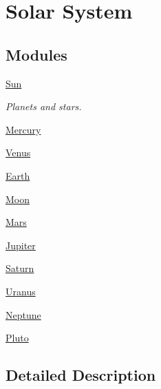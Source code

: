 \hypertarget{group___e_g_x_phys-_constants-_astrophysics-_solar_system}{}\section{Solar System}
\label{group___e_g_x_phys-_constants-_astrophysics-_solar_system}
\subsection*{Modules}
\begin{DoxyCompactItemize}
\item 
\mbox{\hyperlink{group___e_g_x_phys-_constants-_astrophysics-_solar_system-_sun}{Sun}}
\begin{DoxyCompactList}\small\item\em Planets and stars. \end{DoxyCompactList}\item 
\mbox{\hyperlink{group___e_g_x_phys-_constants-_astrophysics-_solar_system-_mercury}{Mercury}}
\item 
\mbox{\hyperlink{group___e_g_x_phys-_constants-_astrophysics-_solar_system-_venus}{Venus}}
\item 
\mbox{\hyperlink{group___e_g_x_phys-_constants-_astrophysics-_solar_system-_earth}{Earth}}
\item 
\mbox{\hyperlink{group___e_g_x_phys-_constants-_astrophysics-_solar_system-_moon}{Moon}}
\item 
\mbox{\hyperlink{group___e_g_x_phys-_constants-_astrophysics-_solar_system-_mars}{Mars}}
\item 
\mbox{\hyperlink{group___e_g_x_phys-_constants-_astrophysics-_solar_system-_jupiter}{Jupiter}}
\item 
\mbox{\hyperlink{group___e_g_x_phys-_constants-_astrophysics-_solar_system-_saturn}{Saturn}}
\item 
\mbox{\hyperlink{group___e_g_x_phys-_constants-_astrophysics-_solar_system-_uranus}{Uranus}}
\item 
\mbox{\hyperlink{group___e_g_x_phys-_constants-_astrophysics-_solar_system-_neptune}{Neptune}}
\item 
\mbox{\hyperlink{group___e_g_x_phys-_constants-_astrophysics-_solar_system-_pluto}{Pluto}}
\end{DoxyCompactItemize}


\subsection{Detailed Description}
